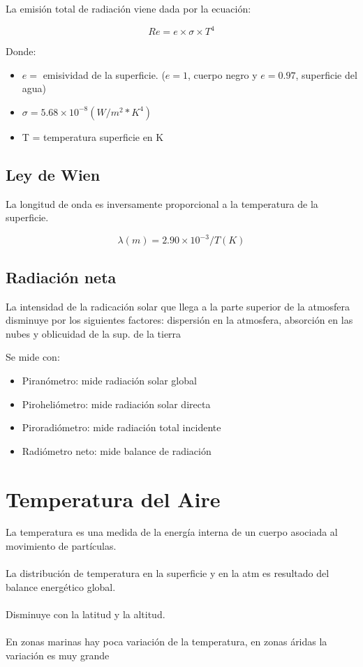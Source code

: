La emisión total de radiación viene dada por la ecuación: 

\begin{equation}
    Re = e \times \sigma \times T^4
\end{equation}

Donde:
\begin{itemize}
    \item $e = $ emisividad de la superficie. ($e = 1$, cuerpo negro y $e = 0.97$, superficie del agua)
    \item $\sigma = 5.68 \times 10^{-8} (W/m^2 * K^4)$
    \item T = temperatura superficie en K  
\end{itemize}

\subsection{Ley de Wien}
La longitud de onda es inversamente proporcional a la temperatura de la superficie.

\begin{equation}
    \lambda (m) = 2.90 \times 10^{-3} / T (K)
\end{equation}

\subsection{Radiación neta}

La intensidad de la radicación solar que llega a la parte superior de la atmosfera disminuye por los siguientes factores: dispersión en la atmosfera, absorción en las nubes y oblicuidad de la sup. de la tierra

Se mide con:
\begin{itemize}
    \item Piranómetro: mide radiación solar global
    \item Piroheliómetro: mide radiación solar directa
    \item Piroradiómetro: mide radiación total incidente 
    \item Radiómetro neto: mide balance de radiación 
\end{itemize}

\section{Temperatura del Aire}

La temperatura es una medida de la energía interna de un cuerpo asociada al movimiento de partículas.
\\\\
La distribución de temperatura en la superficie y en la atm es resultado del balance energético global.
\\\\
Disminuye con la latitud y la altitud.
\\\\
En zonas marinas hay poca variación de la temperatura, en zonas áridas la variación es muy grande

